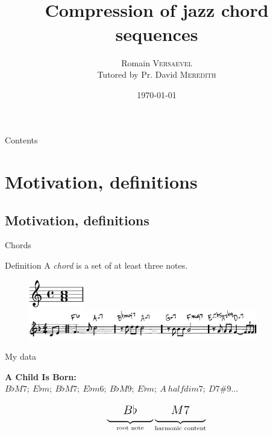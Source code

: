 \documentclass[10pt]{beamer}
\title[Compression of jazz chord sequences]{\\ \Large Compression of jazz chord sequences}
\author[R. Versaevel]{\normalsize Romain \textsc{Versaevel}\newline \\ \normalsize Tutored by Pr. David \textsc{Meredith}}
\date{\today}
\begin{document}
\begin{frame}
\titlepage
\end{frame}

\begin{frame}{Contents}
\tableofcontents
\end{frame}

\section{Motivation, definitions}
\subsection{Motivation, definitions}

\begin{frame}{Chords}
\begin{block}{Definition}
A \emph{chord} is a set of at least three notes.
\end{block} \bigskip \pause

\begin{figure}
\centering
\includegraphics[height = 1.2cm]{images/chordstaff.jpg} \\ \bigskip
\includegraphics[width = 10cm]{images/waww.jpg}
\end{figure}
\end{frame}

\begin{frame}{My data}
\begin{block}{\textbf{A Child Is Born: }}
$B\flat M7;~E\flat m;~B\flat M7;~E\flat m6;~B\flat M9;~E\flat m;~A~halfdim7;~D 7\#9\dots$
\end{block} \bigskip \pause

\begin{equation*}
\Large
\underbrace{\strut~~~~B\flat~~~~}_{\text{root note}} \underbrace{\strut~~~~M7~~~~}_{\text{harmonic content}}
\end{equation*}
\end{frame}
\end{document}
